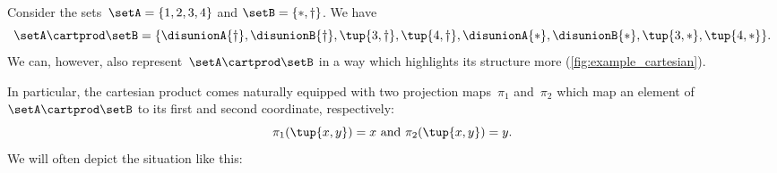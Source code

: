 \begin{example}
  Consider the sets~$\setA = \{1, 2, 3, 4\}$ and $\setB = \{ \ast, \dagger \}$.
  We have
  \begin{equation}\label{eq:cart-prod-example}
    \setA \cartprod \setB = \{ \disunionA{\dagger}, \disunionB{ \dagger}, \tup{3, \dagger}, \tup{4, \dagger}, \disunionA{*}, \disunionB{ *}, \tup{3, *}, \tup{4, *} \}.
  \end{equation}
  We can, however, also represent~$\setA \cartprod \setB$ in a way which highlights its structure more (\cref{fig:example_cartesian}).

  \begin{figure}[h!]
    \begin{center}
    \end{center}
  \end{figure}
  In particular, the cartesian product comes naturally equipped with two projection maps~$\pi_1$ and~$\pi_2$ which map an element of~$\setA \cartprod \setB$ to its first and second coordinate, respectively:
  \begin{equation*}
    \pi_1(\tup{x,y}) =  x \text{ and } \pi_2(\tup{x,y}) = y.
  \end{equation*}
We will often depict the situation like this:
\end{example}
  \begin{figure}[h!]
  \begin{center}
  \end{center}
    \caption{}
    \label{fig:diagram_cartesian}
  \end{figure}



